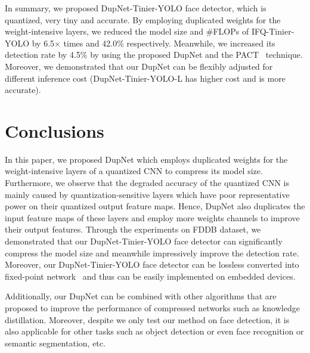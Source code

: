 \documentclass[10pt,twocolumn,letterpaper]{article}
\begin{document}
In summary, we proposed DupNet-Tinier-YOLO face detector, which is quantized, very tiny and accurate. By employing duplicated weights for the weight-intensive layers, we reduced the model size and \#FLOPs of IFQ-Tinier-YOLO by 6.5$\times$ times and 42.0\% respectively. Meanwhile, we increased its detection rate by 4.5\% by using the proposed DupNet and the PACT~\cite{PACT} technique.  Moreover, we demonstrated that our DupNet can be flexibly adjusted for different inference cost (\eg DupNet-Tinier-YOLO-L has higher cost and is more accurate).


\section{Conclusions}
In this paper, we proposed DupNet which employs duplicated weights for the weight-intensive layers of a quantized CNN to compress its model size. Furthermore, we observe that the degraded accuracy of the quantized CNN is mainly caused by quantization-sensitive layers which have poor representative power on their quantized output feature maps. Hence, DupNet also duplicates the input feature maps of these layers and employ more weights channels to improve their output features. Through the experiments on FDDB dataset, we demonstrated that our DupNet-Tinier-YOLO face detector can significantly compress the model size and meanwhile impressively improve the detection rate. Moreover, our DupNet-Tinier-YOLO face detector can be lossless converted into fixed-point network~\cite{IFQNet} and thus can be easily implemented on embedded devices.

Additionally, our DupNet can be combined with other algorithms that are proposed to improve the performance of compressed networks such as knowledge distillation. Moreover, despite we only test our method on face detection, it is also applicable for other tasks such as object detection or even face recognition or semantic segmentation, etc.

{\small


}
\end{document}
